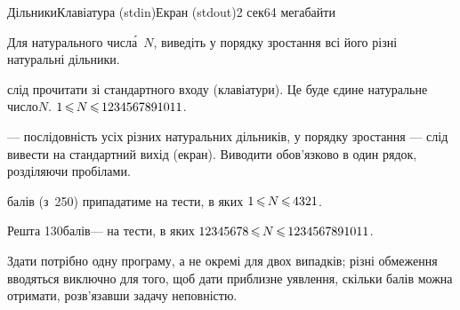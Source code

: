 \begin{problem}{Дільники}{Клавіатура (stdin)}{Екран (stdout)}{2 сек}{64 мегабайти}

Для натурального числ\'{а}~$N$, виведіть у порядку зростання всі його різні натуральні дільники.

\InputFile	слід прочитати зі стандартного входу (клавіатури). Це буде єдине натуральне число\nolinebreak[3] $N$. $1\dib{{\<}}N\dib{{\<}}1234567891011$.

\OutputFile	--- послідовність усіх різних натуральних дільників, у порядку зростання — слід вивести на стандартний вихід (екран). Виводити обов’язково в один рядок, розділяючи пробілами.


\Examples
\begin{exampleSimple}{5em}{21em}%
%
%
\end{exampleSimple}

 балів (з~250) припадатиме на тести, в яких $1\dib{{\<}}N\dib{{\<}}4321$.

Решта 130\nolinebreak[3] балів\nolinebreak[3] --- на тести, в яких $12345678\dib{{\<}}N\dib{{\<}}1234567891011$.

Здати потрібно одну програму, а не окремі для двох випадків; різні обмеження вводяться виключно для того, щоб дати приблизне уявлення, скільки балів можна отримати, розв’язавши задачу не\nolinebreak[3] повністю.

\end{problem}